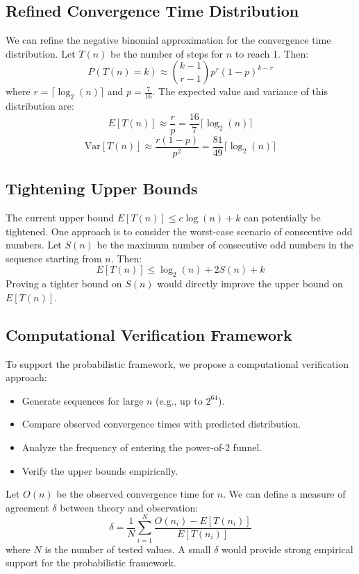 \documentclass{article}
\begin{document}
\subsection{Refined Convergence Time Distribution}
We can refine the negative binomial approximation for the convergence time distribution. Let $T(n)$ be the number of steps for $n$ to reach 1. Then:
\[
P(T(n) = k) \approx \binom{k-1}{r-1} p^r (1 - p)^{k-r}
\]
where $r = \lceil \log_2(n) \rceil$ and $p = \frac{7}{16}$.
The expected value and variance of this distribution are:
\[
E[T(n)] \approx \frac{r}{p} = \frac{16}{7} \lceil \log_2(n) \rceil
\]
\[
\text{Var}[T(n)] \approx \frac{r(1 - p)}{p^2} = \frac{81}{49} \lceil \log_2(n) \rceil
\]

\subsection{Tightening Upper Bounds}
The current upper bound $E[T(n)] \leq c \log(n) + k$ can potentially be tightened. One approach is to consider the worst-case scenario of consecutive odd numbers. Let $S(n)$ be the maximum number of consecutive odd numbers in the sequence starting from $n$. Then:
\[
E[T(n)] \leq \log_2(n) + 2S(n) + k
\]
Proving a tighter bound on $S(n)$ would directly improve the upper bound on $E[T(n)]$.

\subsection{Computational Verification Framework}
To support the probabilistic framework, we propose a computational verification approach:
\begin{itemize}
    \item Generate sequences for large $n$ (e.g., up to $2^{64}$).
    \item Compare observed convergence times with predicted distribution.
    \item Analyze the frequency of entering the power-of-2 funnel.
    \item Verify the upper bounds empirically.
\end{itemize}
Let $O(n)$ be the observed convergence time for $n$. We can define a measure of agreement $\delta$ between theory and observation:
\[
\delta = \frac{1}{N} \sum_{i=1}^{N} \frac{O(n_i) - E[T(n_i)]}{E[T(n_i)]}
\]
where $N$ is the number of tested values. A small $\delta$ would provide strong empirical support for the probabilistic framework.
\end{document}

